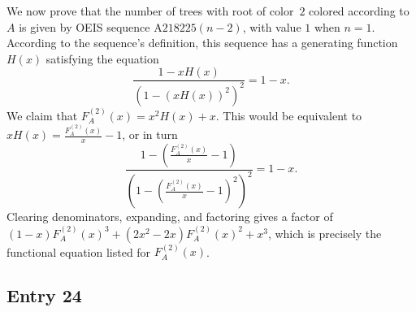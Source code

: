 \documentclass[12pt]{amsart}
\newcommand{\gff}[2]{F_{#2}^{(#1)}(x)}
\newcommand{\gfa}[1]{\gff{#1}{A}}
\begin{document}
\begin{description}
We now prove that the number of trees with root of color~$2$ colored according to $A$ is given by OEIS sequence $\text{A218225}(n-2)$, with value $1$ when $n=1$. According to the sequence's definition, this sequence has a generating function $H(x)$ satisfying the equation
\[
\frac{1 - xH(x)}{(1 - (xH(x))^2)^2} = 1 - x.
\]
We claim that $\gfa{2}=x^2H(x)+x$. This would be equivalent to $xH(x)=\frac{\gfa{2}}{x}-1$, or in turn
\[
\frac{1 - \left(\frac{\gfa{2}}{x}-1\right)}{\left(1 - \left(\frac{\gfa{2}}{x}-1\right)^2\right)^2} = 1 - x.
\]
Clearing denominators, expanding, and factoring gives a factor of $(1-x)\gfa{2}^3+(2x^2-2x)\gfa{2}^2+x^3$, which is precisely the functional equation listed for $\gfa{2}$.
\end{description}

\subsection*{Entry 24}
\end{document}
